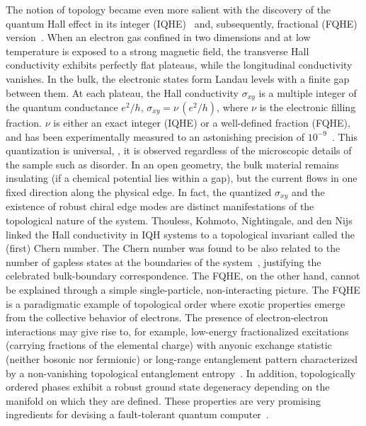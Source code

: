 The notion of topology became even more salient with the discovery of the quantum Hall effect in its integer (IQHE)~\cite{IQHE1980} and, subsequently, fractional (FQHE) version~\cite{FQHE1982}. When an electron gas confined in two dimensions and at low temperature is exposed to a strong magnetic field, the transverse Hall conductivity exhibits perfectly flat plateaus, while the longitudinal conductivity vanishes. In the bulk, the electronic states form Landau levels with a finite gap between them. At each plateau, the Hall conductivity $\sigma_{xy}$ is a multiple integer of the quantum conductance $e^2/h$, $\sigma_{xy} = \nu \, (e^2 / h)$, where $\nu$ is the electronic filling fraction. $\nu$ is either an exact integer (IQHE) or a well-defined fraction (FQHE), and has been experimentally measured to an astonishing precision of $10^{-9}$~\cite{codata2016}. This quantization is universal, \ie, it is observed regardless of the microscopic details of the sample such as disorder. In an open geometry, the bulk material remains insulating (if a chemical potential lies within a gap), but the current flows in one fixed direction along the physical edge. In fact, the quantized $\sigma_{xy}$ and the existence of robust chiral edge modes are distinct manifestations of the topological nature of the system. Thouless, Kohmoto, Nightingale, and den Nijs~\cite{TKNN1982} linked the Hall conductivity in IQH systems to a topological invariant called the (first) Chern number. The Chern number was found to be also related to the number of gapless states at the boundaries of the system~\cite{PhysRevLett.71.3697}, justifying the celebrated bulk-boundary correspondence. The FQHE, on the other hand, cannot be explained through a simple single-particle, non-interacting picture. The FQHE is a paradigmatic example of topological order where exotic properties emerge from the collective behavior of electrons. The presence of electron-electron interactions may give rise to, for example, low-energy fractionalized excitations (carrying fractions of the elemental charge) with anyonic exchange statistic (neither bosonic nor fermionic) or long-range entanglement pattern characterized by a non-vanishing topological entanglement entropy~\cite{RevWen2017}. In addition, topologically ordered phases exhibit a robust ground state degeneracy depending on the manifold on which they are defined. These properties are very promising ingredients for devising a fault-tolerant quantum computer~\cite{RevNayak2008}.

